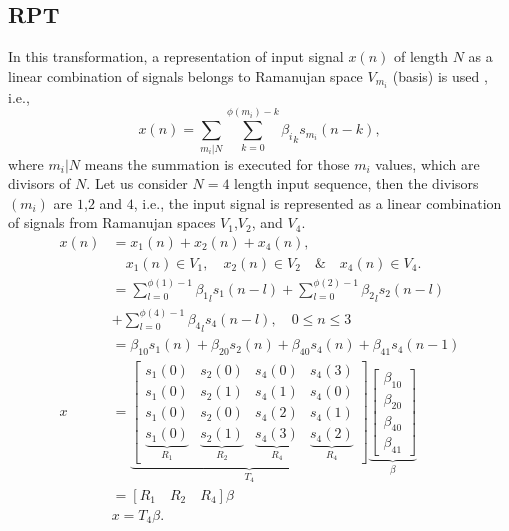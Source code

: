 \documentclass[conference]{IEEEtran}
\begin{document}
\subsection{RPT}
In this transformation, a representation of input signal $x(n)$ of length $N$ as a linear combination of signals belongs to Ramanujan space $V_{m_i}$ (basis) is used \cite{6839030}, i.e.,
\begin{equation}
x(n) = \sum_{{m_i}|N}\sum_{k=0}^{\phi{(m_i)}-k}{\beta_i}_{k}s_{m_i}(n-k),
\end{equation}
where $m_i |N$ means the summation is executed for those $m_i$ values, which are divisors of $N$. Let us consider $N = 4$ length input sequence, then the divisors $(m_i)$ are $1$,$2$ and $4$, i.e., the input signal is represented as a linear combination of signals from Ramanujan spaces $V_1$,$V_2$, and $V_4$. 
\begin{equation}
\begin{aligned}
x(n) & = x_1 (n)  + x_2 (n)  + x_4 (n),\\ & \quad {x_1}(n) {\in} {V_1},{\quad} { x_2(n)} {\in}{V_2} {\quad}{ \&}{\quad} { x_4(n)} {\in} {V_4}.\\
 & = \sum_{l=0}^{\phi{(1)}-1}{\beta_1}_{l}s_{1}(n-l)+\sum_{l=0}^{\phi{(2)}-1}{\beta_2}_{l}s_{2}(n-l)\\
& +\sum_{l=0}^{\phi{(4)}-1}{\beta_4}_{l}s_{4}(n-l),{\quad} 0{\leq}n{\leq}3\\
& = \beta_{10}{s_1}(n)+\beta_{20}{s_2}(n)+\beta_{40}{s_4}(n)+\beta_{41}{s_4}(n-1)\\
x & = \underbrace{\begin{bmatrix}
{s_1}(0) & {s_2}(0) & {s_4}(0) & {s_4}(3)\\
{s_1}(0) & {s_2}(1) & {s_4}(1) & {s_4}(0)\\
{s_1}(0) & {s_2}(0) & {s_4}(2) & {s_4}(1)\\
\underbrace{{s_1}(0)}_{R_1} & \underbrace{{s_2}(1)}_{R_2} & \underbrace{{s_4}(3)}_{R_4} & \underbrace{{s_4}(2)}_{R_4}
\end{bmatrix}}_{T_4}
\underbrace{\begin{bmatrix}
\beta_{10}\\
\beta_{20}\\
\beta_{40}\\
\beta_{41}
\end{bmatrix}}_{\beta}\\ & = {[{R_1}\quad {R_2}\quad {R_4}]}{\beta}\\ & x = {T_4}{\beta}.
\end{aligned}
\end{equation}
\end{document}
